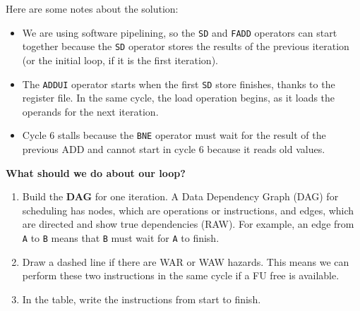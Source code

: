 \begin{enumerate}
    \highspace
    Here are some notes about the solution:
    \begin{itemize}
        \item We are using software pipelining, so the \texttt{SD} and \texttt{FADD} operators can start together because the \texttt{SD} operator stores the results of the previous iteration (or the initial loop, if it is the first iteration).

        \item The \texttt{ADDUI} operator starts when the first \texttt{SD} store finishes, thanks to the register file. In the same cycle, the load operation begins, as it loads the operands for the next iteration.

        \item Cycle 6 stalls because the \texttt{BNE} operator must wait for the result of the previous ADD and cannot start in cycle 6 because it reads old values.
    \end{itemize}

    \newpage

    \textcolor{Green3}{ \textbf{What should we do about our loop?}}
    \begin{enumerate}
        \item Build the \textbf{DAG} for one iteration. A Data Dependency Graph (DAG) for scheduling has nodes, which are operations or instructions, and edges, which are directed and show true dependencies (RAW). For example, an edge from \texttt{A} to \texttt{B} means that \texttt{B} must wait for \texttt{A} to finish.
        \item Draw a dashed line if there are WAR or WAW hazards. This means we can perform these two instructions in the same cycle if a FU free is available.
        \item In the table, write the instructions from start to finish.
    \end{enumerate}
    \begin{center}
\end{center}
\end{enumerate}
